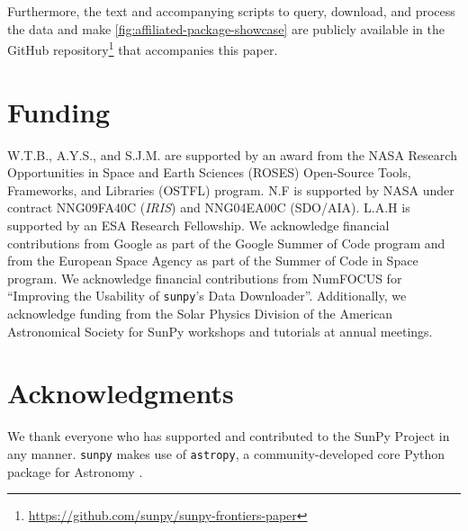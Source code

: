 \documentclass[utf8]{FrontiersinHarvard}
\newcommand{\package}[1]{\texttt{#1}\xspace}
\newcommand{\github}{GitHub\xspace}
\newcommand{\sunpy}{SunPy\xspace}
\newcommand{\sunpyproj}{SunPy Project\xspace}
\newcommand{\sunpypkg}{\package{sunpy}}
\newcommand{\astropypkg}{\package{astropy}}
\begin{document}
Furthermore, the text and accompanying scripts to query, download, and process the data and make \autoref{fig:affiliated-package-showcase} are publicly available in the \github repository\footnote{\url{https://github.com/sunpy/sunpy-frontiers-paper}} that accompanies this paper.

\section*{Funding}
\label{sec:funding}

W.T.B., A.Y.S., and S.J.M. are supported by an award from the NASA Research Opportunities in Space and Earth Sciences (ROSES) Open-Source Tools, Frameworks, and Libraries (OSTFL) program.
N.F is supported by NASA under contract NNG09FA40C ({\it IRIS}) and NNG04EA00C (SDO/AIA).
L.A.H is supported by an ESA Research Fellowship.
We acknowledge financial contributions from Google as part of the Google Summer of Code program and from the European Space Agency as part of the Summer of Code in Space program.
We acknowledge financial contributions from NumFOCUS for \enquote{Improving the Usability of \sunpypkg's Data Downloader}.
Additionally, we acknowledge funding from the Solar Physics Division of the American Astronomical Society for \sunpy workshops and tutorials at annual meetings.

\section*{Acknowledgments}
\label{sec:acknowledgments}

We thank everyone who has supported and contributed to the \sunpyproj in any manner.
\sunpypkg makes use of \astropypkg, a community-developed core Python package for Astronomy \citep{astropy_collaboration_astropy_2022}.




\listofchanges
\end{document}
